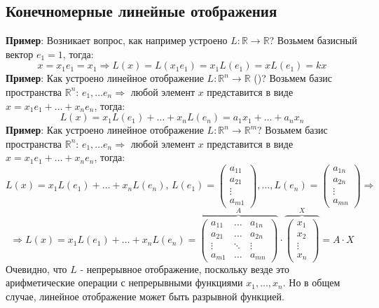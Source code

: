 \documentclass[12pt]{article}
\newcommand{\MR}{\mathbb{R}}
\theoremstyle{definition}
\begin{document}
\subsection*{Конечномерные линейные отображения}
\textbf{Пример}: Возникает вопрос, как например устроено $L \colon \MR \to \MR$? Возьмем базисный вектор $e_1 = 1$, тогда: 
$$
	x = x_1 e_1 = x_1 \Rightarrow L(x) = L(x_1 e_1) = x_1L(e_1) = x L(e_1) = kx
$$
\textbf{Пример}: Как устроено линейное отображение $L\colon \MR^n \to \MR$ ()? Возьмем базис пространства $\MR^n$: $e_1,\dotsc e_n \Rightarrow$ любой элемент $x$ представится в виде $x = x_1 e_1 + \dotsc + x_n e_n$, тогда:
$$
	L(x) = x_1 L(e_1) + \dotsc + x_n L(e_n) = a_1 x_1 + \dotsc + a_n x_n
$$
\textbf{Пример}: Как устроено линейное отображение $L\colon \MR^n \to \MR^m$? Возьмем базис пространства $\MR^n$: $e_1,\dotsc e_n \Rightarrow$ любой элемент $x$ представится в виде $x = x_1 e_1 + \dotsc + x_n e_n$, тогда:
$$
	L(x) = x_1 L(e_1) + \dotsc + x_n L(e_n), \, 
	L(e_1) = \begin{pmatrix}
		a_{11}\\
		a_{21}\\
		\vdots\\
		a_{m1}
	\end{pmatrix}, \dotsc,
	L(e_n) = \begin{pmatrix}
		a_{1n}\\
		a_{2n}\\
		\vdots\\
		a_{mn}
	\end{pmatrix} \Rightarrow
$$
$$
	\Rightarrow L(x) = x_1 L(e_1) + \dotsc + x_n L(e_n) = 
	\overbrace{\begin{pmatrix}
		a_{11} & \dotsc & a_{1n}\\
		a_{21} & \dotsc & a_{2n}\\
		\vdots & \ddots & \vdots\\
		a_{m1} & \dotsc & a_{mn}
	\end{pmatrix}}^{A}{\cdot}
	\overbrace{\begin{pmatrix}
		x_1\\
		x_2\\
		\vdots\\
		x_n
	\end{pmatrix}}^{X} = A{\cdot}X
$$
Очевидно, что $L$ - непрерывное отображение, поскольку везде это арифметические операции с непрерывными функциями $x_1,\dotsc, x_n$. Но в общем случае, линейное отображение может быть разрывной функцией.
\end{document}
